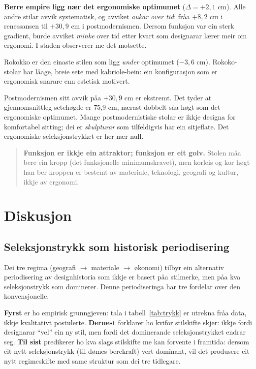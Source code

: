 \documentclass[10pt, a4paper, twocolumn]{article}
\begin{document}
\textbf{Berre empire ligg n\ae r det ergonomiske optimumet} ($\Delta = +2{,}1$ cm). Alle andre stilar avvik systematisk, og avviket \emph{aukar over tid}: fr\r{a}a $+8{,}2$ cm i renessansen til $+30{,}9$ cm i postmodernismen. Dersom funksjon var ein sterk gradient, burde avviket \emph{minke} over tid etter kvart som designarar l\ae rer meir om ergonomi. I staden observerer me det motsette.

Rokokko er den einaste stilen som ligg \emph{under} optimumet ($-3{,}6$ cm). Rokoko-stolar har l\r{a}age, breie sete med kabriole-bein: ein konfigurasjon som er ergonomisk snarare enn estetisk motivert.

Postmodernismen sitt avvik p\r{a}a $+30{,}9$ cm er ekstremt. Det tyder at gjennomsnittleg seteh\o gde er 75{,}9 cm, n\ae rast dobbelt s\r{a}a h\o gt som det ergonomiske optimumet. Mange postmodernistiske stolar er ikkje designa for komfortabel sitting; dei er \emph{skulpturar} som tilfeldigvis har ein sitjeflate. Det ergonomiske seleksjonstrykket er her n\ae r null.

\begin{quote}
\textbf{Funksjon er ikkje ein attraktor; funksjon er eit golv.} Stolen m\r{a}a bere ein kropp (det funksjonelle minimumskravet), men korleis og kor h\o gt han ber kroppen er bestemt av materiale, teknologi, geografi og kultur, ikkje av ergonomi.
\end{quote}


\section{Diskusjon}

\subsection{Seleksjonstrykk som historisk periodisering}

Dei tre regima (geografi $\rightarrow$ materiale $\rightarrow$ \o konomi) tilbyr ein alternativ periodisering av designhistoria som ikkje er basert p\r{a}a stilmerke, men p\r{a}a kva seleksjonstrykk som dominerer. Denne periodiseringa har tre fordelar over den konvensjonelle.

\textbf{Fyrst} er ho empirisk grunngjeven: tala i tabell~\ref{tab:trykk} er utrekna fr\r{a}a data, ikkje kvalitativt postulerte. \textbf{Dernest} forklarer ho kvifor stilskifte skjer: ikkje fordi designarar ``vel'' ein ny stil, men fordi det dominerande seleksjonstrykket endrar seg. \textbf{Til sist} predikerer ho kva slags stilskifte me kan forvente i framtida: dersom eit nytt seleksjonstrykk (til d\o mes berekraft) vert dominant, vil det produsere eit nytt regimeskifte med same struktur som dei tre tidlegare.
\end{document}

